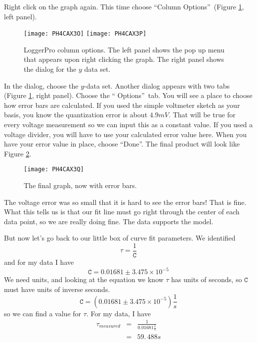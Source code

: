 Right click on the graph again. This time choose
\textquotedblleft Column Options\textquotedblright\ 
(Figure \ref{fig:colopts}, left panel).
\begin{figure}[tbp!]
	\centering
\texttt{[image: PH4CAX3O]}
\texttt{[image: PH4CAX3P]}
	\caption[LoggerPro column options]{LoggerPro column options. The left
	panel shows the pop up menu that appears upon right clicking the 
	graph. The right panel shows the dialog for the $y$ data set.}
	\label{fig:colopts}
\end{figure}
In the dialog, choose the $y$-data set.
Another dialog appears with two tabs
(Figure \ref{fig:colopts}, right panel). Choose the \textquotedblleft
Options\textquotedblright\ tab. 
You will see a place to choose how error bars are calculated. If you used
the simple voltmeter sketch as your basis, you know the quantization error
is about $4.9\unit{mV}.$ That will be true for every voltage measurement so
we can input this as a constant value. If you used a voltage divider, you
will have to use your calculated error value here. When you have your error
value in place, choose \textquotedblleft Done\textquotedblright. The final
product will look like Figure \ref{fig:rc_done}.
\begin{figure}[htbp!]
	\centering
\texttt{[image: PH4CAX3Q]}
	\caption{The final graph, now with error bars.}
	\label{fig:rc_done}
\end{figure}

The voltage error was so small that it is hard to see the error bars! That
is fine. What this tells us is that our fit line must go right through the
center of each data point, so we are really doing fine. The
data supports the model.

But now let's go back to our little box of curve fit parameters. We
identified 
\begin{equation*}
\tau =\frac{1}{\mathtt{C}}
\end{equation*}%
and for my data I have 
\begin{equation*}
\mathtt{C}=0.01681\pm 3.475\times 10^{-5}
\end{equation*}%
\newline
We need units, and looking at the equation we know $\tau $ has units of
seconds, so $\mathtt{C}$ must have units of inverse seconds.%
\begin{equation*}
\mathtt{C}=\left( 0.01681\pm 3.475\times 10^{-5}\right) \frac{1}{\unit{s}}
\end{equation*}%
so we can find a value for $\tau .$ For my data, I have 
\begin{eqnarray*}
\tau _{measured} &=&\frac{1}{0.01681\frac{1}{\unit{s}}} \\
&=&59.\,\allowbreak 488\unit{s}
\end{eqnarray*}

